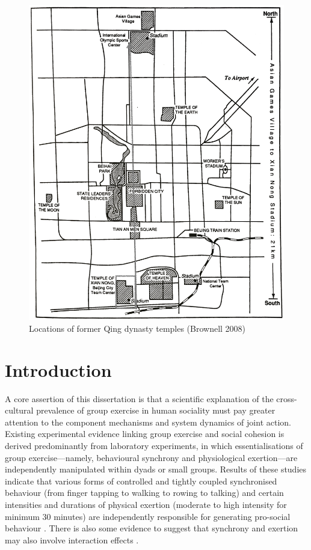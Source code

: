 \begin{figure}[htbp]
  \includegraphics[width = \linewidth]{images/beijingTemplesXNT.png}
  \caption{Locations of former Qing dynasty temples (Brownell 2008)}
  \label{fig:beijingTemplesXNT}
\end{figure}


\section{Introduction}

A core assertion of this dissertation is that a scientific explanation of the cross-cultural prevalence of group exercise in human sociality must pay greater attention to the component mechanisms and system dynamics of joint action.  Existing experimental evidence linking group exercise and social cohesion is derived predominantly from laboratory experiments, in which essentialisations of group exercise---namely, behavioural synchrony and physiological exertion---are independently manipulated within dyads or small groups.  Results of these studies indicate that various forms of controlled and tightly coupled synchronised behaviour (from finger tapping to walking to rowing to talking) and certain intensities and durations of physical exertion (moderate to high intensity for minimum 30 minutes) are independently responsible for generating pro-social behaviour \citep{Tarr2015}.  There is also some evidence to suggest that synchrony and exertion may also involve interaction effects \citep{Lewis2018}.


